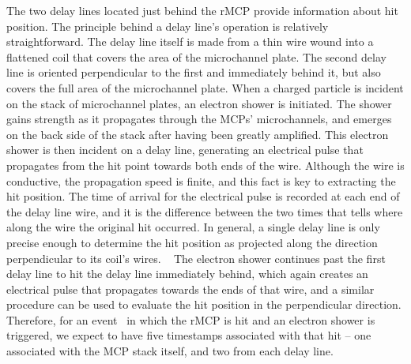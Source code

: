 The two delay lines located just behind the rMCP provide information about hit position.  The principle behind a delay line's operation is relatively straightforward.  The delay line itself is made from a thin wire wound into a flattened coil that covers the area of the microchannel plate.  The second delay line is oriented perpendicular to the first and immediately behind it, but also covers the full area of the microchannel plate.  When a charged particle is incident on the stack of microchannel plates, an electron shower is initiated.  The shower gains strength as it propagates through the MCPs' microchannels, and emerges on the back side of the stack after having been greatly amplified.  This electron shower is then incident on a delay line, generating an electrical pulse that propagates from the hit point towards both ends of the wire.  Although the wire is conductive, the propagation speed is finite, and this fact is key to extracting the hit position.  The time of arrival for the electrical pulse is recorded at each end of the delay line wire, and it is the difference between the two times that tells where along the wire the original hit occurred.  In general, a single delay line is only precise enough to determine the hit position as projected along the direction perpendicular to its coil's wires.
~ 
The electron shower continues past the first delay line to hit the delay line immediately behind, which again creates an electrical pulse that propagates towards the ends of that wire, and a similar procedure can be used to evaluate the hit position in the perpendicular direction.  Therefore, for an event~ in which the rMCP is hit and an electron shower is triggered, we expect to have five timestamps associated with that hit -- one associated with the MCP stack itself, and two from each delay line.


